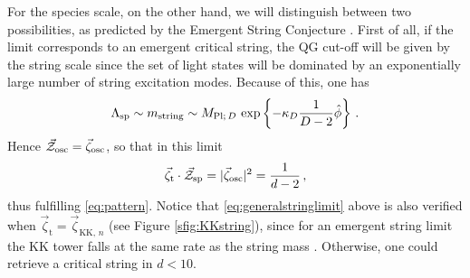 For the species scale, on the other hand, we will distinguish between two possibilities, as predicted by the Emergent String Conjecture \cite{Lee:2019wij}. First of all, if the limit corresponds to an emergent critical string, the QG cut-off will be given by the string scale since the set of light states will be dominated by an exponentially large number of string excitation modes. Because of this, one has
%
\begin{equation} \label{eq:stringmassdependence}
	\Lambda_{\text{sp}} \sim m_{\rm string}\sim M_{\text{Pl};\, D}\, \exp\left\{-\kappa_D\frac{1}{D-2} \hat \phi\right\}\, .
\end{equation}
%
Hence $\vec{\mathcal{Z}}_{\rm osc}=\vec{\zeta}_{\rm osc}$, so that in this limit
%
\begin{equation}\label{eq:generalstringlimit}
	\vec{\zeta}_{\text{t}}\cdot\vec{\mathcal{Z}}_{\rm sp}=|\vec{\zeta}_{\rm osc}|^2=\frac{1}{d-2}\, ,
\end{equation}
%
thus fulfilling \eqref{eq:pattern}. Notice that \eqref{eq:generalstringlimit} above is also verified when $\vec{\zeta}_{\text{t}}=\vec{\zeta}_{\text{KK},\, n}$ (see Figure \ref{sfig:KKstring}), since for an emergent string limit the KK tower falls at the same rate as the string mass \cite{Lee:2019wij}. Otherwise, one could retrieve a critical string in $d<10$.
	
